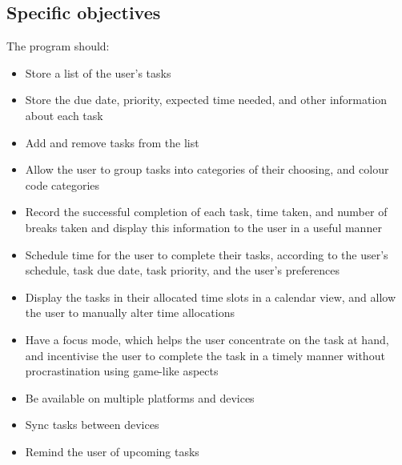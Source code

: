 \documentclass{article}
\begin{document}
\subsection{Specific objectives}
The program should:

\begin{itemize}
\item Store a list of the user's tasks
\item Store the due date, priority, expected time needed, and other information
  about each task
\item Add and remove tasks from the list
\item Allow the user to group tasks into categories of their choosing, and
  colour code categories
\item Record the successful completion of each task, time taken, and number of
  breaks taken and display this information to the user in a useful manner
\item Schedule time for the user to complete their tasks, according to the
  user's schedule, task due date, task priority, and the user's preferences
\item Display the tasks in their allocated time slots in a calendar view, and
  allow the user to manually alter time allocations
\item Have a focus mode, which helps the user concentrate on the task at hand,
  and incentivise the user to complete the task in a timely manner without
  procrastination using game-like aspects
\item Be available on multiple platforms and devices
\item Sync tasks between devices
\item Remind the user of upcoming tasks
\end{itemize}
\end{document}
